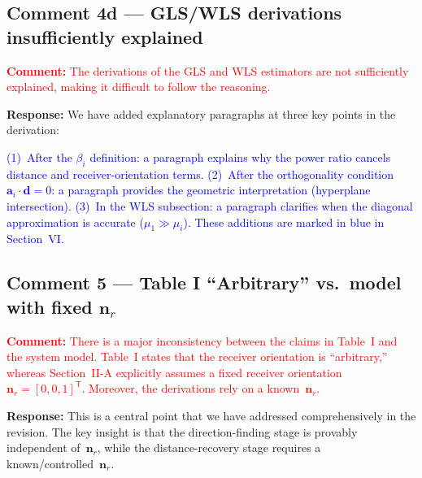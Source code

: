 \documentclass[11pt]{article}
\newcommand{\reviewercomment}[1]{\noindent\textcolor{red}{\textbf{Comment:} #1}\par\vspace{6pt}}
\newcommand{\response}{\noindent\textbf{Response:} }
\newcommand{\change}[1]{\textcolor{blue}{#1}}
\begin{document}
\subsection{Comment 4d --- GLS/WLS derivations insufficiently explained}

\reviewercomment{The derivations of the GLS and WLS estimators are not sufficiently explained, making it difficult to follow the reasoning.}

\response We have added explanatory paragraphs at three key points in the derivation:

\change{(1)~After the $\beta_i$ definition: a paragraph explains why the power ratio cancels distance and receiver-orientation terms. (2)~After the orthogonality condition $\mathbf{a}_i\cdot\mathbf{d}=0$: a paragraph provides the geometric interpretation (hyperplane intersection). (3)~In the WLS subsection: a paragraph clarifies when the diagonal approximation is accurate ($\mu_1 \gg \mu_i$). These additions are marked in blue in Section~VI.}

\subsection{Comment 5 --- Table I ``Arbitrary'' vs.\ model with fixed $\mathbf{n}_r$}

\reviewercomment{There is a major inconsistency between the claims in Table~I and the system model. Table~I states that the receiver orientation is ``arbitrary,'' whereas Section~II-A explicitly assumes a fixed receiver orientation $\mathbf{n}_r = [0,0,1]^{\mathsf T}$. Moreover, the derivations rely on a known~$\mathbf{n}_r$.}

\response This is a central point that we have addressed comprehensively in the revision. The key insight is that the direction-finding stage is provably independent of~$\mathbf{n}_r$, while the distance-recovery stage requires a known/controlled~$\mathbf{n}_r$.
\end{document}
